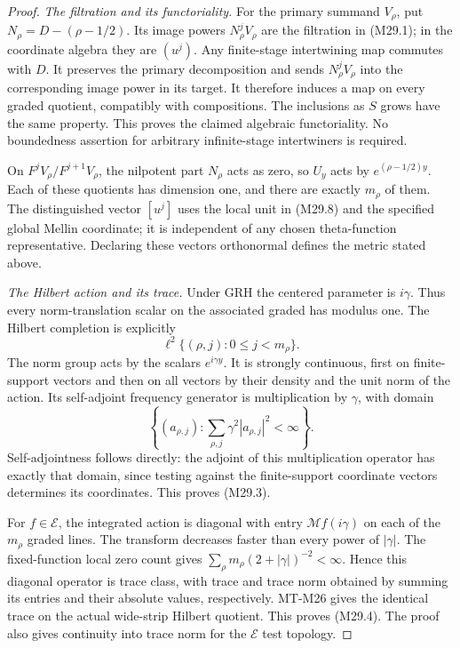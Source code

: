 \begin{proof}
\emph{The filtration and its functoriality.}
For the primary summand \(V_\rho\), put
\(N_\rho=D-(\rho-1/2)\). Its image powers
\(N_\rho^j V_\rho\) are the filtration in (M29.1);
in the coordinate algebra they are \((u^j)\).
Any finite-stage intertwining map commutes with \(D\).
It preserves the primary decomposition and sends
\(N_\rho^j V_\rho\) into the corresponding image power
in its target. It therefore induces a map on every
graded quotient, compatibly with compositions.
The inclusions as \(S\) grows have the same property.
This proves the claimed algebraic functoriality.
No boundedness assertion for arbitrary infinite-stage
intertwiners is required.

On \(F^jV_\rho/F^{j+1}V_\rho\), the nilpotent part
\(N_\rho\) acts as zero, so \(U_y\) acts by
\(e^{(\rho-1/2)y}\). Each of these quotients has
dimension one, and there are exactly \(m_\rho\)
of them. The distinguished vector \([u^j]\)
uses the local unit in (M29.8) and the specified
global Mellin coordinate; it is independent of
any chosen theta-function representative.
Declaring these vectors orthonormal defines
the metric stated above.

\emph{The Hilbert action and its trace.}
Under GRH the centered parameter is \(i\gamma\).
Thus every norm-translation scalar on the associated
graded has modulus one. The Hilbert completion is
explicitly
\[
             \ell^2\{(\rho,j):0\le j<m_\rho\}.
 \]
The norm group acts by the scalars \(e^{i\gamma y}\).
It is strongly continuous, first on finite-support
vectors and then on all vectors by their density
and the unit norm of the action.
Its self-adjoint frequency generator is multiplication
by \(\gamma\), with domain
\[
       \left\{(a_{\rho,j}):
                    \sum_{\rho,j}\gamma^2|a_{\rho,j}|^2
                                      <\infty\right\}.
 \]
Self-adjointness follows directly: the adjoint of
this multiplication operator has exactly that
domain, since testing against the finite-support
coordinate vectors determines its coordinates.
This proves (M29.3).

For \(f\in\mathcal E\), the integrated action is
diagonal with entry \(\mathcal Mf(i\gamma)\)
on each of the \(m_\rho\) graded lines. The transform
decreases faster than every power of \(|\gamma|\).
The fixed-function local zero count gives
\(\sum_\rho m_\rho(2+|\gamma|)^{-2}<\infty\).
Hence this diagonal operator is trace class, with
trace and trace norm obtained by summing its
entries and their absolute values, respectively.
MT-M26 gives the identical trace on the actual
wide-strip Hilbert quotient. This proves (M29.4).
The proof also gives continuity into trace norm
for the \(\mathcal E\) test topology.


\end{proof}
